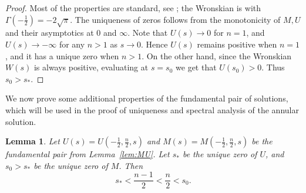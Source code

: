 \documentclass[11pt]{article}
\numberwithin{equation}{section}
\newtheorem{lemma}[theorem]{Lemma}
\theoremstyle{definition}
\begin{document}
\begin{proof}
    Most of the properties are standard, see \cite[{\S13.2, 13.3, 13.7}]{DLMF}; the Wronskian is \cite[(13.2.34)]{DLMF} with $\Gamma(-\tfrac12)=-2\sqrt{\pi}$. The uniqueness of zeros follows from the monotonicity of $M, U$ and their asymptotics at $0$ and $\infty$. Note that $U(s) \to 0$ for $n=1$, and $U(s) \to -\infty$ for any $n>1$ as $s\to 0$. Hence $U(s)$ remains positive when $n=1$, and it has a unique zero when $n>1$. On the other hand, since the Wronskian $W(s)$ is always positive, evaluating at $s=s_0$ we get that $U(s_0)>0$. Thus $s_0>s_*$.
\end{proof}
We now prove some additional properties of the fundamental pair of solutions, which will be used in the proof of uniqueness and spectral analysis of the annular solution.


    \begin{lemma}\label{lem:MUroots}
Let $U(s)=U(-\tfrac12,\tfrac n2,s)$ and $M(s)=M(-\tfrac12,\tfrac n2,s)$ be the fundamental pair from
Lemma~\ref{lem:MU}. Let $s_*$ be the unique zero of $U$, and $s_0>s_*$ be the unique zero of $M$.
Then
\[
s_*<\frac{n-1}{2}<\frac n2<s_0 .
\]
\end{lemma}
\end{document}
